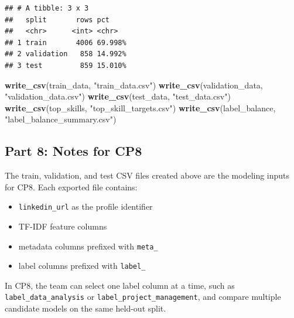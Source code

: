 \documentclass[
]{article}
\newenvironment{Shaded}{\begin{snugshade}}{\end{snugshade}}
\newcommand{\FunctionTok}[1]{\textcolor[rgb]{0.13,0.29,0.53}{\textbf{#1}}}
\newcommand{\NormalTok}[1]{#1}
\newcommand{\StringTok}[1]{\textcolor[rgb]{0.31,0.60,0.02}{#1}}
\providecommand{\tightlist}{%
  \setlength{\itemsep}{0pt}\setlength{\parskip}{0pt}}
\begin{document}
\begin{verbatim}
## # A tibble: 3 x 3
##   split       rows pct    
##   <chr>      <int> <chr>  
## 1 train       4006 69.998%
## 2 validation   858 14.992%
## 3 test         859 15.010%
\end{verbatim}

\begin{Shaded}
\begin{Highlighting}[]
\FunctionTok{write\_csv}\NormalTok{(train\_data, }\StringTok{"train\_data.csv"}\NormalTok{)}
\FunctionTok{write\_csv}\NormalTok{(validation\_data, }\StringTok{"validation\_data.csv"}\NormalTok{)}
\FunctionTok{write\_csv}\NormalTok{(test\_data, }\StringTok{"test\_data.csv"}\NormalTok{)}
\FunctionTok{write\_csv}\NormalTok{(top\_skills, }\StringTok{"top\_skill\_targets.csv"}\NormalTok{)}
\FunctionTok{write\_csv}\NormalTok{(label\_balance, }\StringTok{"label\_balance\_summary.csv"}\NormalTok{)}
\end{Highlighting}
\end{Shaded}

\subsection{Part 8: Notes for CP8}\label{part-8-notes-for-cp8}

The train, validation, and test CSV files created above are the modeling
inputs for CP8. Each exported file contains:

\begin{itemize}
\tightlist
\item
  \texttt{linkedin\_url} as the profile identifier
\item
  TF-IDF feature columns
\item
  metadata columns prefixed with \texttt{meta\_}
\item
  label columns prefixed with \texttt{label\_}
\end{itemize}

In CP8, the team can select one label column at a time, such as
\texttt{label\_data\_analysis} or \texttt{label\_project\_management},
and compare multiple candidate models on the same held-out split.
\end{document}
